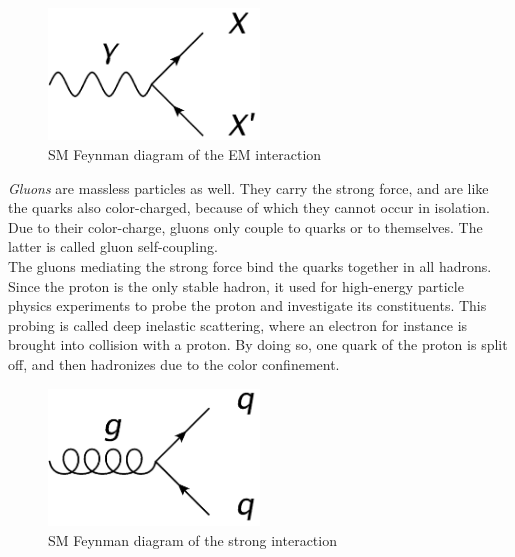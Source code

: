 \begin{minipage}{0.4\textwidth}
\centering
\begin{figure}[H]\centering
\includegraphics[width=0.5\textwidth]{Feynman_diagrams/Jaxo_EM.png}
\caption{SM Feynman diagram of the EM interaction}
\label{fig:Feynman:EM} 
\end{figure}
\end{minipage}

\begin{minipage}{0.55\textwidth}
\textit{Gluons} are massless particles as well.
They carry the strong force, and are like the quarks also color-charged, because of which they cannot occur in isolation.
Due to their color-charge, gluons only couple to quarks or to themselves.
The latter is called gluon self-coupling.\\
The gluons mediating the strong force bind the quarks together in all hadrons.
Since the proton is the only stable hadron, it used for high-energy particle physics experiments to probe the proton and investigate its constituents.
This probing is called deep inelastic scattering, where an electron for instance is brought into collision with a proton.
By doing so, one quark of the proton is split off, and then hadronizes due to the color confinement.
\end{minipage} \hfill
\begin{minipage}{0.4\textwidth}
\centering
\begin{figure}[H]\centering
\includegraphics[width=0.5\textwidth]{Feynman_diagrams/Jaxo_strong.png}
\caption{SM Feynman diagram of the strong interaction}
\label{fig:Feynman:strong} 
\end{figure}
\end{minipage}

